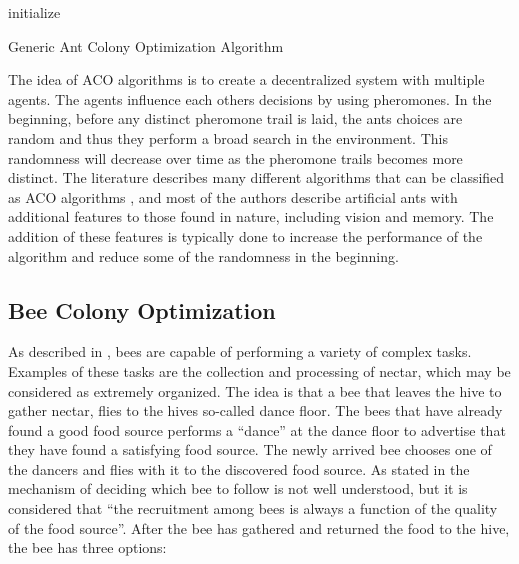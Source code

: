 \begin{algorithm}[H]
 initialize\;
 \caption{Generic Ant Colony Optimization Algorithm}
\end{algorithm}


The idea of ACO algorithms is to create a decentralized system with multiple agents. The agents influence each others decisions by using pheromones. In the beginning, before any distinct pheromone trail is laid, the ants choices are random and thus they perform a broad search in the environment. This randomness will decrease over time as the pheromone trails becomes more distinct. The literature describes many different algorithms that can be classified as ACO algorithms \citep{salehi-nezhad07,tripathi09,jiang10, dias14}, and most of the authors describe artificial ants with additional features to those found in nature, including vision and memory. The addition of these features is typically done to increase the performance of the algorithm and reduce some of the randomness in the beginning.  


\subsection{Bee Colony Optimization}
As described in \citet{lucic03}, bees are capable of performing a variety of complex tasks. Examples of these tasks are the collection and processing of nectar, which may be considered as extremely organized. The idea is that a bee that leaves the hive to gather nectar, flies to the hives so-called dance floor. The bees that have already found a good food source performs a ``dance'' at the dance floor to advertise that they have found a satisfying food source. The newly arrived bee chooses one of the dancers and flies with it to the discovered food source. As stated in \citet{lucic03} the mechanism of deciding which bee to follow is not well understood, but it is considered that ``the recruitment among bees is always a function of the quality of the food source''. After the bee has gathered and returned the food to the hive, the bee has three options\citep{lucic03}:

